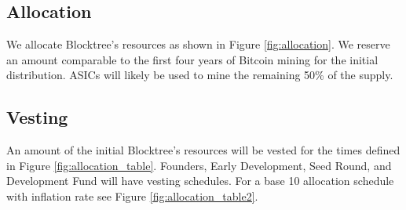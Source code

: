 \documentclass[12pt]{article}
\begin{document}
\subsection{Allocation}

We allocate Blocktree's resources as shown in Figure \ref{fig:allocation}. 
We reserve an amount comparable to the first four years of Bitcoin mining for the initial distribution.  ASICs will likely be used to mine the remaining 50\% of the supply.



\subsection{Vesting}

An amount of the initial Blocktree's resources will be vested for the times defined in Figure \ref{fig:allocation_table}. Founders, Early Development, Seed Round, and Development Fund will have vesting schedules. For a base 10 allocation schedule with inflation rate see Figure \ref{fig:allocation_table2}.
\end{document}
